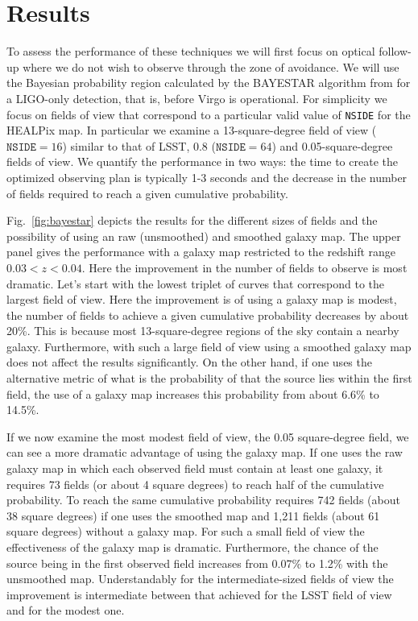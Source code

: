 \documentclass[useAMS,usenatbib]{mn2e}
\begin{document}
\section{Results}

To assess the performance of these techniques we will first focus on optical
follow-up where we do not wish to observe through the zone of
avoidance.  We will use the Bayesian probability region calculated by
the BAYESTAR algorithm \citep{2015arXiv150803634S} from
\citet{2014ApJ...795..105S} for a LIGO-only detection, that is, before
Virgo is operational.  For simplicity we focus on fields of view that
correspond to a particular valid value of \texttt{NSIDE} for the
HEALPix map.  In particular we examine a 13-square-degree field of
view ($\mathtt{NSIDE}=16$) similar to that of LSST, 0.8
($\mathtt{NSIDE}=64$) and 0.05-square-degree fields of view.  We
quantify the performance in two ways: the time to create the optimized
observing plan is typically 1-3 seconds and the decrease in the number
of fields required to reach a given cumulative probability.

Fig.~\ref{fig:bayestar} depicts the results for the different sizes of
fields and the possibility of using an raw (unsmoothed) and smoothed
galaxy map.  The upper panel gives the performance with a galaxy map
restricted to the redshift range $0.03<z<0.04$.  Here the improvement
in the number of fields to observe is most dramatic.  Let's start with
the lowest triplet of curves that correspond to the largest field of
view.  Here the improvement is of using a galaxy map is modest, the
number of fields to achieve a given cumulative probability decreases
by about 20\%.  This is because most 13-square-degree regions of the
sky contain a nearby galaxy. Furthermore, with such a large field of
view using a smoothed galaxy map does not affect the results
significantly.  On the other hand, if one uses the alternative metric
of what is the probability of that the source lies within the first
field, the use of a galaxy map increases this probability from about
6.6\% to 14.5\%.

If we now examine the most modest field of view, the 0.05 square-degree
field, we can see a more dramatic advantage of using the galaxy map.
If one uses the raw galaxy map in which each observed field must
contain at least one galaxy, it requires 73 fields (or about 4 square
degrees) to reach half of the cumulative probability.  To reach the
same cumulative probability requires 742 fields (about 38 square
degrees) if one uses the smoothed map and 1,211 fields (about 61 square
degrees) without a galaxy map.  For such a small field of view the
effectiveness of the galaxy map is dramatic.  Furthermore, the chance
of the source being in the first observed field increases from 0.07\%
to 1.2\% with the unsmoothed map.  Understandably for the
intermediate-sized fields of view the improvement is intermediate
between that achieved for the LSST field of view and for the modest one.
\end{document}
